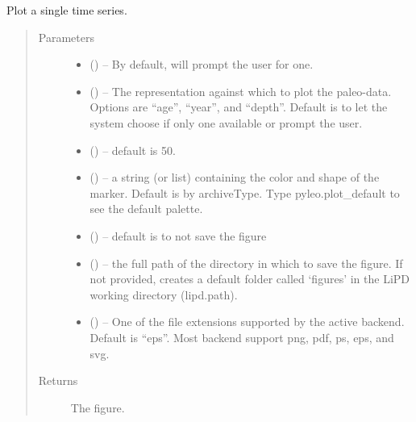 \documentclass[letterpaper,10pt,english]{sphinxmanual}
\begin{document}
\begin{fulllineitems}
\label{\detokenize{Main:pyleoclim.plotTs}}
Plot a single time series.
\begin{quote}\begin{description}
\item[{Parameters}] \leavevmode\begin{itemize}
\item {} 
 () -- By default, will prompt the user for one.

\item {} 
 () -- The representation against which to plot the paleo-data.
Options are ``age'', ``year'', and ``depth''. Default is to let the
system choose if only one available or prompt the user.

\item {} 
 () -- default is 50.

\item {} 
 () -- a string (or list) containing the color and shape of the
marker. Default is by archiveType. Type pyleo.plot\_default to see
the default palette.

\item {} 
 () -- default is to not save the figure

\item {} 
 () -- the full path of the directory in which to save the figure.
If not provided, creates a default folder called `figures' in the
LiPD working directory (lipd.path).

\item {} 
 () -- One of the file extensions supported by the active
backend. Default is ``eps''. Most backend support png, pdf, ps, eps,
and svg.

\end{itemize}

\item[{Returns}] \leavevmode
The figure.

\end{description}\end{quote}

\end{fulllineitems}
\end{document}
